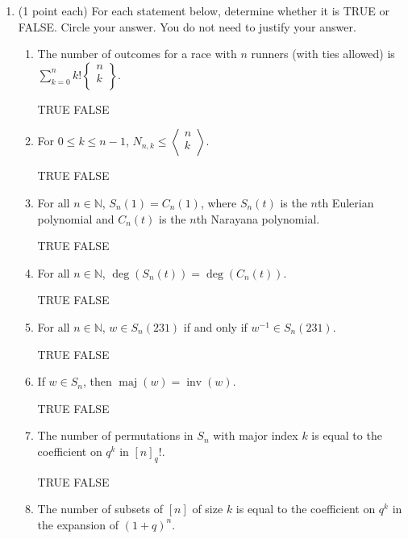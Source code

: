\documentclass[11pt]{article}
\theoremstyle{definition}
\DeclareMathOperator{\inv}{inv}
\DeclareMathOperator{\maj}{maj}
\newcommand{\euler}[2]{
  \displaystyle \left\langle\begin{matrix}#1  \\#2  \\ \end{matrix}\right\rangle}
\newcommand{\stirling}[2]{
  \displaystyle \left\{\begin{matrix}#1  \\#2  \\ \end{matrix}\right\}}
\begin{document}
\newpage

\begin{enumerate}

\item (1 point each) For each statement below, determine whether it is TRUE or FALSE.  Circle your answer. 
You do not need to justify your answer.

\begin{enumerate}%

\item The number of outcomes for a race with $n$ runners (with ties allowed) is $\displaystyle\sum_{k=0}^n k!\stirling{n}{k}$.

\smallskip

TRUE \qquad FALSE

\item For $0\leq k\leq n-1$, $\displaystyle N_{n,k}\leq \euler{n}{k}$. 

\smallskip

TRUE \qquad FALSE

\item For all $n\in\mathbb{N}$, $S_n(1) = C_n(1)$, where $S_n(t)$ is the $n$th Eulerian polynomial and $C_n(t)$ is the $n$th Narayana polynomial.

\smallskip

TRUE \qquad FALSE

\item For all $n\in\mathbb{N}$, $\deg(S_n(t)) = \deg(C_n(t))$.

\smallskip

TRUE \qquad FALSE

\item For all $n\in\mathbb{N}$, $w\in S_n(231)$ if and only if $w^{-1}\in S_n(231)$.

\smallskip

TRUE \qquad FALSE

\item If $w\in S_n$, then $\maj(w)=\inv(w)$.

\smallskip

TRUE \qquad FALSE

\item The number of permutations in $S_n$ with major index $k$ is equal to the coefficient on $q^k$ in $[n]_q!$.

\smallskip

TRUE \qquad FALSE

\item The number of subsets of $[n]$ of size $k$ is equal to the coefficient on $q^k$ in the expansion of $(1+q)^n$.


\end{enumerate}
\end{enumerate}
\end{document}
